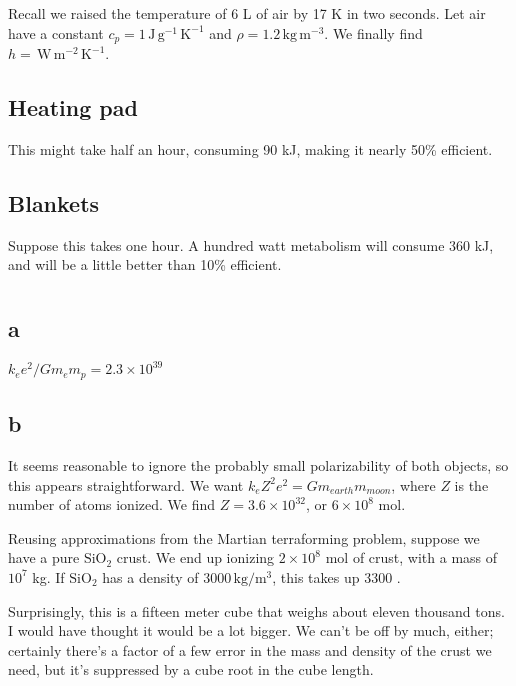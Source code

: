 \documentclass[12pt]{article}
\begin{document}
Recall we raised the temperature of 6 L of air by 17 K in two seconds. Let air have a constant \(c_p = 1 \,\mathrm{J}\,\mathrm{g}^{-1}\,\mathrm{K}^{-1}\) and \(\rho = 1.2 \,\mathrm{kg}\,\mathrm{m}^{-3}\). We finally find \(h = \,\mathrm{W}\,\mathrm{m}^{-2}\,\mathrm{K}^{-1}\).

\subsection{Heating pad}

This might take half an hour, consuming 90 kJ, making it nearly 50\% efficient.

\subsection{Blankets}

Suppose this takes one hour. A hundred watt metabolism will consume 360 kJ, and will be a little better than 10\% efficient.


\section{}

\subsection*{a}

\(k_ee^2/Gm_em_{p} = 2.3 \times 10^{39}\)

\subsection*{b}

It seems reasonable to ignore the probably small polarizability of both objects, so this appears straightforward. We want \(k_e Z^2 e^2 = Gm_{earth}m_{moon}\), where \(Z\) is the number of atoms ionized. We find \(Z=3.6\times 10^{32}\), or \(6 \times 10^8\) mol.

Reusing approximations from the Martian terraforming problem, suppose we have a pure \(\mathrm{Si}\mathrm{O}_2\) crust. We end up ionizing \(2\times 10^8\) mol of crust, with a mass of \(10^7\) kg. If \(\mathrm{Si}\mathrm{O}_2\) has a density of \(3000 \,\mathrm{kg}/\mathrm{m}^3\), this takes up 3300 \mcb.

Surprisingly, this is a fifteen meter cube that weighs about eleven thousand tons. I would have thought it would be a lot bigger. We can't be off by much, either; certainly there's a factor of a few error in the mass and density of the crust we need, but it's suppressed by a cube root in the cube length.
\end{document}
